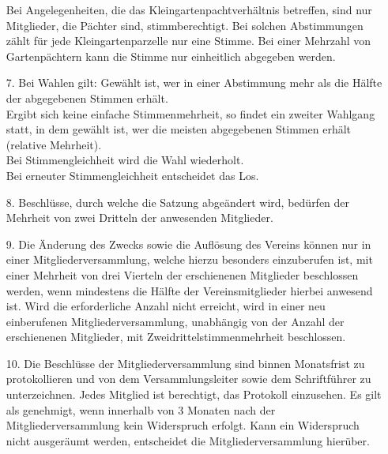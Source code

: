 \documentclass{scrartcl}
\begin{document}
\begin{itemize}
              Bei Angelegenheiten, die das Kleingartenpachtverhältnis betreffen, sind
              nur Mitglieder, die Pächter sind, stimmberechtigt. Bei solchen
              Abstimmungen zählt für jede Kleingartenparzelle nur eine Stimme. Bei einer
              Mehrzahl von Gartenpächtern kann die Stimme nur einheitlich abgegeben
              werden.
	\item[7.] Bei Wahlen gilt: Gewählt ist, wer in einer Abstimmung mehr als die Hälfte
			  der abgegebenen Stimmen erhält.\\
			  Ergibt sich keine einfache Stimmenmehrheit, so findet ein zweiter Wahlgang
			  statt, in dem gewählt ist, wer die meisten abgegebenen Stimmen erhält
			  (relative Mehrheit).\\
			  Bei Stimmengleichheit wird die Wahl wiederholt.\\
			  Bei erneuter Stimmengleichheit entscheidet das Los.
	\item[8.] Beschlüsse, durch welche die Satzung abgeändert wird, bedürfen der
	          Mehrheit von zwei Dritteln der anwesenden Mitglieder.
	\item[9.] Die Änderung des Zwecks sowie die Auflösung des Vereins können nur in
	          einer Mitgliederversammlung, welche hierzu besonders einzuberufen ist, mit
	          einer Mehrheit von drei Vierteln der erschienenen Mitglieder beschlossen
	          werden, wenn mindestens die Hälfte der Vereinsmitglieder hierbei anwesend
	          ist. Wird die erforderliche Anzahl nicht erreicht, wird in einer neu
	          einberufenen Mitgliederversammlung, unabhängig von der Anzahl der
	          erschienenen Mitglieder, mit Zweidrittelstimmenmehrheit beschlossen.
	\item[10.] Die Beschlüsse der Mitgliederversammlung sind binnen Monatsfrist zu
			   protokollieren und von dem Versammlungsleiter sowie dem Schriftführer zu
			   unterzeichnen. Jedes Mitglied ist berechtigt, das Protokoll einzusehen.
			   Es gilt als genehmigt, wenn innerhalb von 3 Monaten nach der
			   Mitgliederversammlung kein Widerspruch erfolgt. Kann ein Widerspruch
			   nicht ausgeräumt werden, entscheidet die Mitgliederversammlung hierüber.
\end{itemize}


\end{document}
